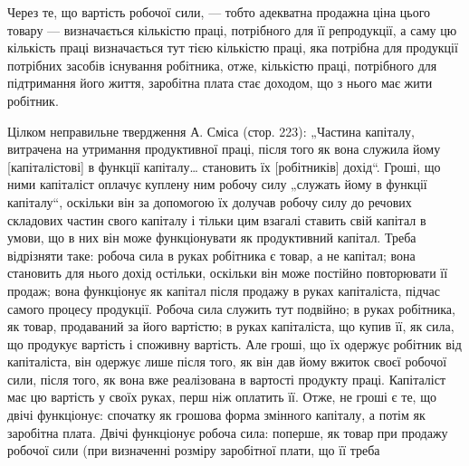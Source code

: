 Через те, що вартість робочої сили, — тобто адекватна продажна ціна цього товару — визначається
кількістю праці, потрібного для її репродукції, а саму цю кількість праці визначається тут тією
кількістю праці, яка потрібна для продукції потрібних засобів існування робітника, отже, кількістю
праці, потрібного для підтримання його життя, заробітна плата стає доходом, що з нього має жити
робітник.

Цілком неправильне твердження А. Сміса (стор. 223): „Частина капіталу, витрачена на утримання
продуктивної праці, після того як вона служила йому [капіталістові] в функції капіталу\dots{} становить
їх [робітників] дохід“. Гроші, що ними капіталіст оплачує куплену ним робочу силу „служать йому в
функції капіталу“, оскільки він за допомогою їх долучав робочу силу до речових складових частин
свого капіталу і тільки цим взагалі ставить свій капітал в умови, що в них він може функціонувати як
продуктивний капітал. Треба відрізняти таке: робоча сила в руках робітника є товар, а не капітал;
вона становить для нього дохід остільки, оскільки він може постійно повторювати її продаж; вона
функціонує як капітал після продажу в руках капіталіста, підчас самого процесу продукції. Робоча
сила служить тут подвійно; в руках робітника, як товар, продаваний за його вартістю; в руках
капіталіста, що купив її, як сила, що продукує вартість і споживну вартість. Але гроші, що їх
одержує робітник від капіталіста, він одержує лише після того, як він дав йому вжиток своєї робочої
сили, після того, як вона вже реалізована в вартості продукту праці. Капіталіст має цю вартість у
своїх руках,
перш ніж оплатить її. Отже, не гроші є те, що двічі функціонує: спочатку як грошова форма змінного
капіталу, а потім як заробітна плата. Двічі функціонує робоча сила: поперше, як товар при продажу
робочої сили (при визначенні розміру заробітної плати, що її треба
\parbreak{}  %
